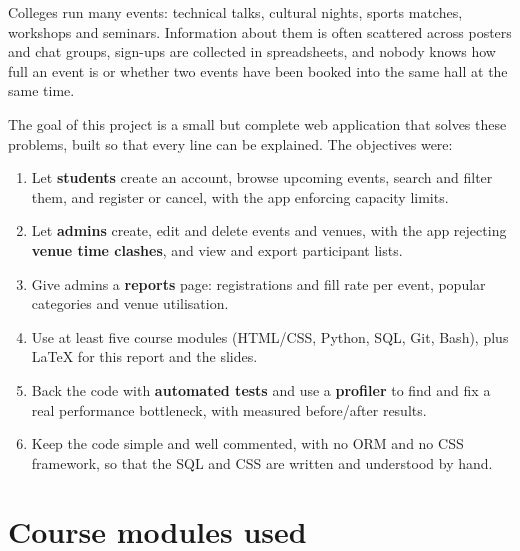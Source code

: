 \documentclass[11pt,a4paper]{article}
\begin{document}
Colleges run many events: technical talks, cultural nights, sports matches, workshops and
seminars. Information about them is often scattered across posters and chat groups, sign-ups
are collected in spreadsheets, and nobody knows how full an event is or whether two events
have been booked into the same hall at the same time.

The goal of this project is a small but complete web application that solves these problems,
built so that every line can be explained. The objectives were:

\begin{enumerate}[itemsep=2pt]
  \item Let \textbf{students} create an account, browse upcoming events, search and filter
        them, and register or cancel, with the app enforcing capacity limits.
  \item Let \textbf{admins} create, edit and delete events and venues, with the app
        rejecting \textbf{venue time clashes}, and view and export participant lists.
  \item Give admins a \textbf{reports} page: registrations and fill rate per event, popular
        categories and venue utilisation.
  \item Use at least five course modules (HTML/CSS, Python, SQL, Git, Bash), plus LaTeX for
        this report and the slides.
  \item Back the code with \textbf{automated tests} and use a \textbf{profiler} to find and fix
        a real performance bottleneck, with measured before/after results.
  \item Keep the code simple and well commented, with no ORM and no CSS framework, so that the
        SQL and CSS are written and understood by hand.
\end{enumerate}

\section{Course modules used}
\end{document}
